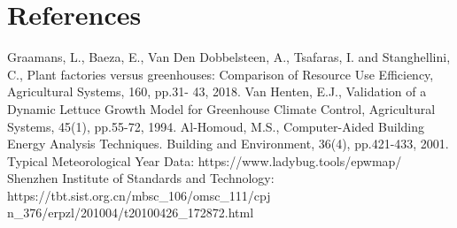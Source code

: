 \newpage
\appendix
\section{References}

\begin{thebibliography}{99}
	Graamans, L., Baeza, E., Van Den Dobbelsteen, A., Tsafaras, I. and Stanghellini, C., Plant factories versus greenhouses: Comparison of Resource Use Efficiency, Agricultural Systems, 160, pp.31-
43, 2018.
	Van Henten, E.J., Validation of a Dynamic Lettuce Growth Model for Greenhouse Climate Control, Agricultural Systems, 45(1), pp.55-72, 1994.
	Al-Homoud, M.S., Computer-Aided Building Energy Analysis Techniques. Building and Environment, 36(4), pp.421-433, 2001.
	Typical Meteorological Year Data: https://www.ladybug.tools/epwmap/
	Shenzhen Institute of Standards and Technology:
	https://tbt.sist.org.cn/mbsc\_106/omsc\_111/cpj
	n\_376/erpzl/201004/t20100426\_172872.html
\end{thebibliography}




